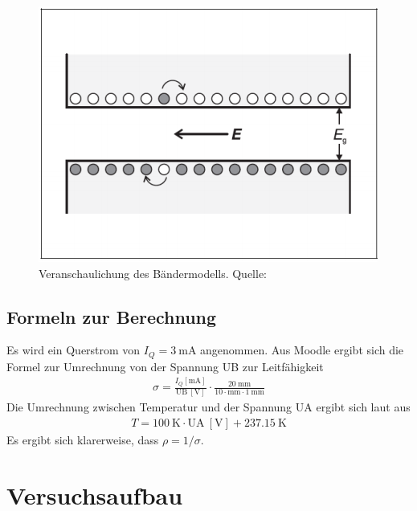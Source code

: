 \documentclass{article}
\begin{document}
\begin{figure}[H]
\includegraphics[scale=1.4]{bandabstand.png}
\caption{Veranschaulichung des Bändermodells. Quelle: \cite{moodle}}
\label{fig:bandabstand}
\end{figure}

\subsection{Formeln zur Berechnung}

Es wird ein Querstrom von $I_Q = 3~$mA angenommen. Aus Moodle ergibt sich die Formel zur Umrechnung von der Spannung UB zur Leitfähigkeit
\begin{align}
\sigma = \frac{I_Q [\text{mA}]}{\text{UB}~[\text{V}]}\cdot \frac{20~\text{mm}}{10\cdot\text{mm}\cdot 1~\text{mm}}
\label{eq:sigma}
\end{align} 
Die Umrechnung zwischen Temperatur und der Spannung UA ergibt sich laut \cite{moodle} aus
\begin{align}
T = 100~\text{K}\cdot \text{UA}~[\text{V}] + 237.15~\text{K}
\label{eq:T}
\end{align}
Es ergibt sich klarerweise, dass $\rho = 1/\sigma$.


\section{Versuchsaufbau}
\end{document}
